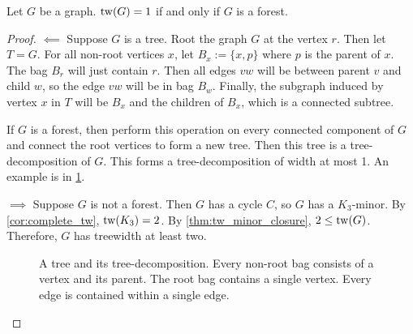 \begin{proposition}\label{lem:treewidth_forest}
	Let $G$ be a graph. \(\operatorname{tw}(G) = 1\) if and only if \(G\) is a forest.
\end{proposition}

\begin{proof}
	$\impliedby$ Suppose \(G\) is a tree. Root the graph \(G\) at the vertex \(r\). Then let \(T = G\). For all non-root vertices $x$, let \(B_x:= \lbrace x, p \rbrace\) where \(p\) is the parent of \(x\). The bag \(B_r\) will just contain \(r\). Then all edges \(vw\) will be between parent \(v\) and child \(w\), so the edge $vw$ will be in bag \(B_w\). Finally, the subgraph induced by vertex \(x\) in \(T\) will be \(B_x\) and the children of \(B_x\), which is a connected subtree.
	\par
	If \(G\) is a forest, then perform this operation on every connected component of \(G\) and connect the root vertices to form a new tree. Then this tree is a tree-decomposition of $G$. This forms a tree-decomposition of width at most 1. An example is in \cref{fig:tree-treedecomp}.
	\par
	$\implies$ Suppose $G$ is not a forest. Then \(G\) has a cycle \(C\), so $G$ has a $K_3$-minor. By \cref{cor:complete_tw}, $\operatorname{tw}(K_3) = 2$. By \cref{thm:tw_minor_closure}, $2 \leq \operatorname{tw}(G)$. Therefore, $G$ has treewidth at least two. 
	\begin{figure}[ht]
		\centering
		
		
		\caption[Tree-Decomposition of a tree]{A tree and its tree-decomposition. Every non-root bag consists of a vertex and its parent. The root bag contains a single vertex. Every edge is contained within a single edge.}\label{fig:tree-treedecomp}
	\end{figure}
\end{proof}

